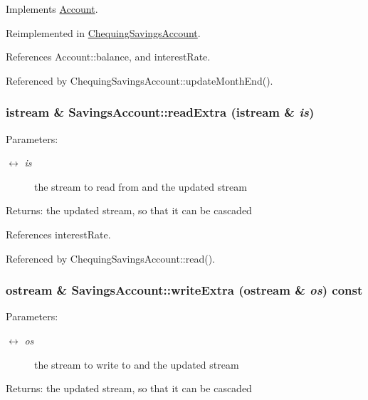 Implements \hyperlink{classAccount_3823d2d885625b78f83088946c257697}{Account}.

Reimplemented in \hyperlink{classChequingSavingsAccount_0bbd0c3b03b968fc2f80eb2a4fffa3f2}{ChequingSavingsAccount}.

References Account::balance, and interestRate.

Referenced by ChequingSavingsAccount::updateMonthEnd().\hypertarget{classSavingsAccount_3afc54ec8471fb44d804750ebe63e1c9}{
\subsubsection[readExtra]{\setlength{\rightskip}{0pt plus 5cm}istream \& SavingsAccount::readExtra (istream \& {\em is})}}
\label{classSavingsAccount_3afc54ec8471fb44d804750ebe63e1c9}


\begin{Desc}
\item[Parameters:]
\begin{description}
\item[\mbox{$\leftrightarrow$} {\em is}]the stream to read from and the updated stream \end{description}
\end{Desc}
\begin{Desc}
\item[Returns:]the updated stream, so that it can be cascaded \end{Desc}


References interestRate.

Referenced by ChequingSavingsAccount::read().\hypertarget{classSavingsAccount_6a2fce79d1bde2580c291847ec1cf989}{
\subsubsection[writeExtra]{\setlength{\rightskip}{0pt plus 5cm}ostream \& SavingsAccount::writeExtra (ostream \& {\em os}) const}}
\label{classSavingsAccount_6a2fce79d1bde2580c291847ec1cf989}


\begin{Desc}
\item[Parameters:]
\begin{description}
\item[\mbox{$\leftrightarrow$} {\em os}]the stream to write to and the updated stream \end{description}
\end{Desc}
\begin{Desc}
\item[Returns:]the updated stream, so that it can be cascaded \end{Desc}


